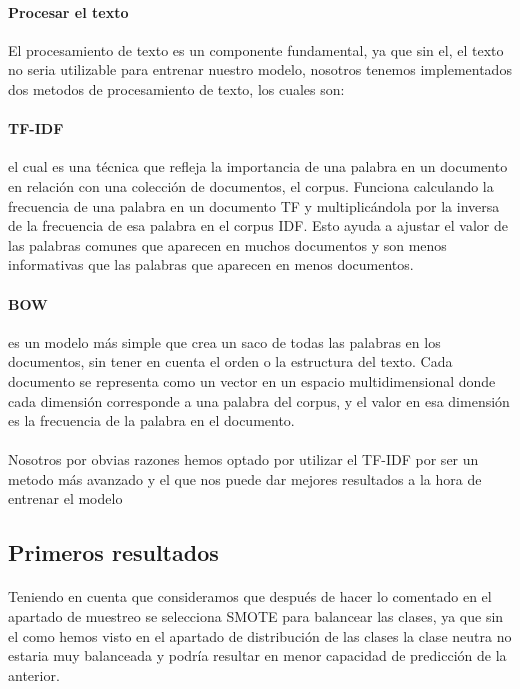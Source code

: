 \documentclass{report}
\begin{document}
{{                \paragraph*{Procesar el texto}{
                    El procesamiento de texto es un componente fundamental, ya que sin el, el texto no seria utilizable para entrenar nuestro modelo, nosotros tenemos implementados dos metodos de procesamiento de texto, los cuales son:
                }
                \paragraph*{TF-IDF}{
                      el cual es una técnica que refleja la importancia de una palabra en un documento en relación con una colección de documentos, el corpus. Funciona calculando la frecuencia de una palabra en un documento TF y multiplicándola por la inversa de la frecuencia de esa palabra en el corpus IDF. Esto ayuda a ajustar el valor de las palabras comunes que aparecen en muchos documentos y son menos informativas que las palabras que aparecen en menos documentos.
                }
                \paragraph*{BOW}{
                     es un modelo más simple que crea un saco de todas las palabras en los documentos, sin tener en cuenta el orden o la estructura del texto. Cada documento se representa como un vector en un espacio multidimensional donde cada dimensión corresponde a una palabra del corpus, y el valor en esa dimensión es la frecuencia de la palabra en el documento.
                }
                \paragraph*{}{
                    Nosotros por obvias razones hemos optado por utilizar el TF-IDF por ser un metodo más avanzado y el que nos puede dar mejores resultados a la hora de entrenar el modelo
                }    
            \clearpage\subsection{Primeros resultados}
                \paragraph*{}{
                Teniendo en cuenta que consideramos que después de hacer lo comentado en el apartado de muestreo se selecciona SMOTE para balancear las clases, ya que sin el como hemos visto en el apartado de distribución de las clases la clase neutra no estaria muy balanceada y podría resultar en menor capacidad de predicción de la anterior.
                }
}}
\end{document}
